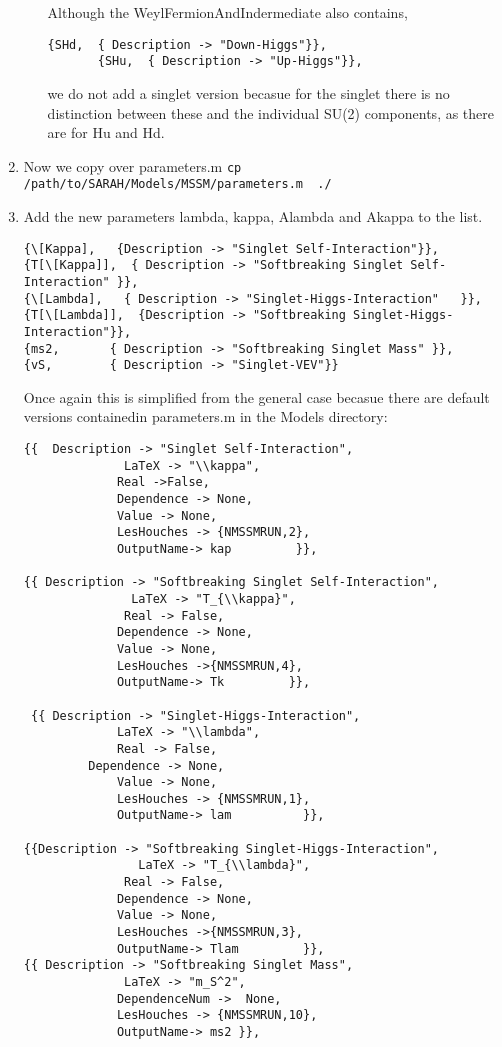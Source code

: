 \documentclass[final,3p,times,pdflatex]{elsarticle}
\newcommand{\code}[1]{\lstinline|#1|}  %
\begin{document}
\begin{enumerate}
\begin{enumerate}
Although the WeylFermionAndIndermediate also contains, 
\begin{lstlisting}
{SHd,  { Description -> "Down-Higgs"}},
       {SHu,  { Description -> "Up-Higgs"}},
\end{lstlisting}
\noindent we do not add a singlet version becasue for the singlet there is no distinction between these and the individual SU(2) components, as there are for Hu and Hd.
\end{enumerate} 
\item Now we copy over parameters.m \code{cp /path/to/SARAH/Models/MSSM/parameters.m  ./}
\item Add the new parameters lambda, kappa, Alambda and Akappa to the list.
\begin{lstlisting}
{\[Kappa],   {Description -> "Singlet Self-Interaction"}},              
{T[\[Kappa]],  { Description -> "Softbreaking Singlet Self-Interaction" }}, 
{\[Lambda],   { Description -> "Singlet-Higgs-Interaction"   }},
{T[\[Lambda]],  {Description -> "Softbreaking Singlet-Higgs-Interaction"}}, 
{ms2,       { Description -> "Softbreaking Singlet Mass" }},
{vS,        { Description -> "Singlet-VEV"}}       
\end{lstlisting}
Once again this is simplified from the general case becasue there are default versions containedin parameters.m in the Models directory:
\begin{lstlisting}
{{  Description -> "Singlet Self-Interaction",
              LaTeX -> "\\kappa",
             Real ->False,
             Dependence -> None, 
             Value -> None, 
             LesHouches -> {NMSSMRUN,2},
             OutputName-> kap         }},                               
               
{{ Description -> "Softbreaking Singlet Self-Interaction",
               LaTeX -> "T_{\\kappa}",
              Real -> False,
             Dependence -> None, 
             Value -> None, 
             LesHouches ->{NMSSMRUN,4},
             OutputName-> Tk         }}, 

 {{ Description -> "Singlet-Higgs-Interaction",
             LaTeX -> "\\lambda",
             Real -> False,
	     Dependence -> None, 
             Value -> None, 
             LesHouches -> {NMSSMRUN,1},
             OutputName-> lam          }},                               
               
{{Description -> "Softbreaking Singlet-Higgs-Interaction",
                LaTeX -> "T_{\\lambda}",
              Real -> False,
             Dependence -> None, 
             Value -> None, 
             LesHouches ->{NMSSMRUN,3},
             OutputName-> Tlam         }},    
{{ Description -> "Softbreaking Singlet Mass", 
              LaTeX -> "m_S^2",
             DependenceNum ->  None, 
             LesHouches -> {NMSSMRUN,10},
             OutputName-> ms2 }},
              

\end{lstlisting}
\end{enumerate}
\end{document}
